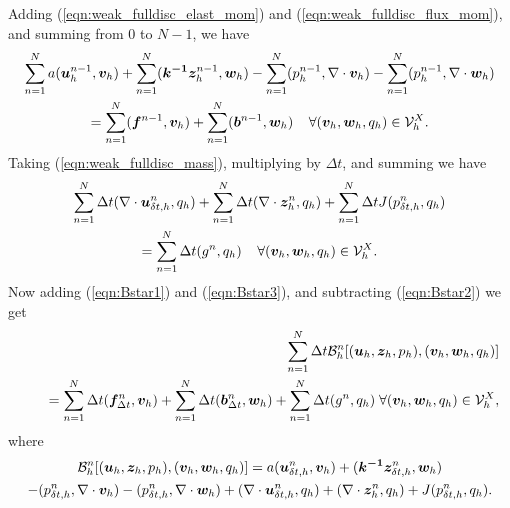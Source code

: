 Adding (\ref{eqn:weak_fulldisc_elast_mom}) and (\ref{eqn:weak_fulldisc_flux_mom}), and  summing from $0$ to $N-1$,
we have
\begin{multline}
\sum_{n=1}^{N}    a(\boldsymbol{u}_{h}^{n-1},\boldsymbol{v}_{h})+ \sum_{n=1}^{N}   (\boldsymbol{k^{-1}} \boldsymbol{z}_{h}^{n-1}, \boldsymbol{w}_{h})   - \sum_{n=1}^{N}   (p_h^{n-1}, \nabla \cdot \boldsymbol{v}_{h})   - \sum_{n=1}^{N}   (p_h^{n-1}, \nabla \cdot \boldsymbol{w}_{h})    \\ =
\sum_{n=1}^{N}   (\boldsymbol{f}^{n-1},\boldsymbol{v}_{h})  + \sum_{n=1}^{N}   (\boldsymbol{b}^{n-1},\boldsymbol{w}_{h}) \;\;  \;\; \forall (\boldsymbol{v}_{h},\boldsymbol{w}_{h},{q}_{h}) \in \mathcal{V}^{X}_{h}.
\label{eqn:Bstar2}
\end{multline}
Taking (\ref{eqn:weak_fulldisc_mass}), multiplying by $\Delta t$, and summing we have
\begin{multline}
 \sum_{n=1}^{N} \Delta t (\nabla \cdot {\boldsymbol{u}_{\delta t,h}^{n}},{q}_{h})  +  \sum_{n=1}^{N} \Delta t ( \nabla \cdot \boldsymbol{z}_{h}^{n}, {q}_{h}) + \sum_{n=1}^{N} \Delta t J({{p}_{\delta t,h}^{n}},{q}_{h}) \\
=  \sum_{n=1}^{N} \Delta t(g^{n},{q}_{h}) \;\; \;\;\forall (\boldsymbol{v}_{h},\boldsymbol{w}_{h},{q}_{h}) \in \mathcal{V}^{X}_{h}.
\label{eqn:Bstar3}
\end{multline}
Now adding (\ref{eqn:Bstar1}) and (\ref{eqn:Bstar3}), and subtracting (\ref{eqn:Bstar2}) we get
\begin{eqnarray*}
\label{eqn:Bstar_weakform}
&&\sum_{n=1}^{N} \Delta t \mathcal{B}_{h}^{n}[(\boldsymbol{u}_{h},\boldsymbol{z}_{h},p_h),(\boldsymbol{v}_{h},\boldsymbol{w}_{h},{q}_{h})] \\
&& \quad = \sum_{n=1}^{N} \Delta t (\boldsymbol{f}^{n}_{\Delta t},\boldsymbol{v}_{h})
         + \sum_{n=1}^{N} \Delta t (\boldsymbol{b}^{n}_{\Delta t },\boldsymbol{w}_{h}) + \sum_{n=1}^{N} \Delta t (g^{n},{q}_{h})
           \; \forall (\boldsymbol{v}_{h},\boldsymbol{w}_{h},{q}_{h}) \in \mathcal{V}^{X}_{h},
\end{eqnarray*}
where
\begin{multline}
\mathcal{B}_{h}^{n}[(\boldsymbol{u}_{h},\boldsymbol{z}_{h},p_h),(\boldsymbol{v}_{h},\boldsymbol{w}_{h},{q}_{h})]
=a({\boldsymbol{u}_{\delta t,h}^{n}},\boldsymbol{v}_{h})+(\boldsymbol{k^{-1}} {\boldsymbol{z}_{\delta t,h}^{n}}, \boldsymbol{w}_{h}) \\
 - ({{p}_{\delta t,h}^{n}}, \nabla \cdot \boldsymbol{v}_{h})  - ({{p}_{\delta t,h}^{n}}, \nabla \cdot \boldsymbol{w}_{h}) + (\nabla \cdot {\boldsymbol{u}_{\delta t,h}^{n}},{q}_{h})  +   ( \nabla \cdot \boldsymbol{z}_{h}^n,{q}_{h}) + J({{p}_{\delta t,h}^{n}},{q}_{h}).
\label{eqn:B_star}
\end{multline}


